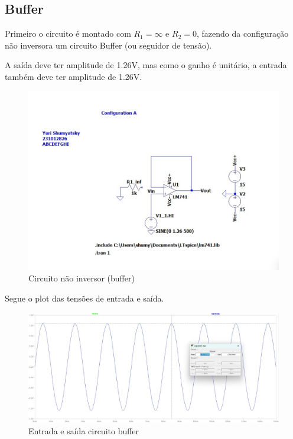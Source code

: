 \documentclass[10pt,twocolumn,letterpaper]{article}
\begin{document}
\subsection{Buffer}

Primeiro o circuito é montado com $R_1=\infty$ e $R_2=0$, fazendo da configuração não inversora um circuito Buffer (ou seguidor de tensão).

A saída deve ter amplitude de 1.26V, mas como o ganho é unitário, a entrada também deve ter amplitude de 1.26V.

\begin{figure}[h]
\caption{Circuito não inversor (buffer)}
\begin{center}
\includegraphics[scale=0.25]{figuras/fig1}
\end{center}
\end{figure}

Segue o plot das tensões de entrada e saída.

\begin{figure}[h]
\caption{Entrada e saída circuito buffer}
\begin{center}
\includegraphics[scale=0.15]{figuras/fig2}
\end{center}
\end{figure}
\end{document}
